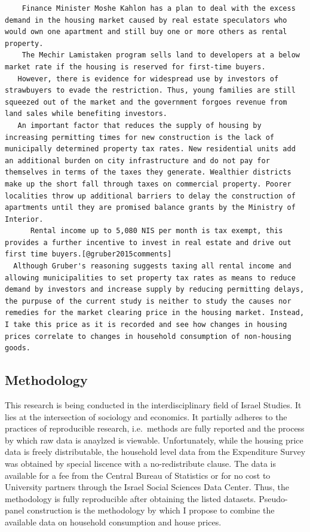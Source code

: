 \documentclass[12pt,a4paper,]{article}
\begin{document}
\begin{verbatim}
    Finance Minister Moshe Kahlon has a plan to deal with the excess demand in the housing market caused by real estate speculators who would own one apartment and still buy one or more others as rental property.
    The Mechir Lamistaken program sells land to developers at a below market rate if the housing is reserved for first-time buyers.
   However, there is evidence for widespread use by investors of strawbuyers to evade the restriction. Thus, young families are still squeezed out of the market and the government forgoes revenue from land sales while benefiting investors.
   An important factor that reduces the supply of housing by increasing permitting times for new construction is the lack of municipally determined property tax rates. New residential units add an additional burden on city infrastructure and do not pay for themselves in terms of the taxes they generate. Wealthier districts make up the short fall through taxes on commercial property. Poorer localities throw up additional barriers to delay the construction of apartments until they are promised balance grants by the Ministry of Interior.
      Rental income up to 5,080 NIS per month is tax exempt, this provides a further incentive to invest in real estate and drive out first time buyers.[@gruber2015comments]
  Although Gruber's reasoning suggests taxing all rental income and allowing municipalities to set property tax rates as means to reduce demand by investors and increase supply by reducing permitting delays, the purpuse of the current study is neither to study the causes nor remedies for the market clearing price in the housing market. Instead, I take this price as it is recorded and see how changes in housing prices correlate to changes in household consumption of non-housing goods.
\end{verbatim}

\subsection{Methodology}\label{methodology}

This research is being conducted in the interdisciplinary field of
Israel Studies. It lies at the intersection of sociology and economics.
It partially adheres to the practices of reproducible research,
i.e.~methods are fully reported and the process by which raw data is
anaylzed is viewable. Unfortunately, while the housing price data is
freely distributable, the household level data from the Expenditure
Survey was obtained by special liscence with a no-redistribute clause.
The data is available for a fee from the Central Bureau of Statistics or
for no cost to University partners through the Israel Social Sciences
Data Center. Thus, the methodology is fully reproducible after obtaining
the listed datasets. Pseudo-panel construction is the methodology by
which I propose to combine the available data on household consumption
and house prices.
\end{document}
